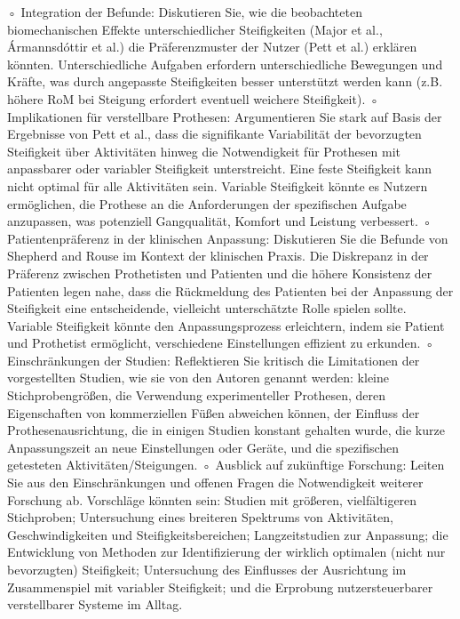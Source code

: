 \documentclass{SeminarV2}
\begin{document}
◦
Integration der Befunde: Diskutieren Sie, wie die beobachteten biomechanischen Effekte unterschiedlicher Steifigkeiten (Major et al., Ármannsdóttir et al.) die Präferenzmuster der Nutzer (Pett et al.) erklären könnten. Unterschiedliche Aufgaben erfordern unterschiedliche Bewegungen und Kräfte, was durch angepasste Steifigkeiten besser unterstützt werden kann (z.B. höhere RoM bei Steigung erfordert eventuell weichere Steifigkeit).
◦
Implikationen für verstellbare Prothesen: Argumentieren Sie stark auf Basis der Ergebnisse von Pett et al., dass die signifikante Variabilität der bevorzugten Steifigkeit über Aktivitäten hinweg die Notwendigkeit für Prothesen mit anpassbarer oder variabler Steifigkeit unterstreicht. Eine feste Steifigkeit kann nicht optimal für alle Aktivitäten sein. Variable Steifigkeit könnte es Nutzern ermöglichen, die Prothese an die Anforderungen der spezifischen Aufgabe anzupassen, was potenziell Gangqualität, Komfort und Leistung verbessert.
◦
Patientenpräferenz in der klinischen Anpassung: Diskutieren Sie die Befunde von Shepherd and Rouse im Kontext der klinischen Praxis. Die Diskrepanz in der Präferenz zwischen Prothetisten und Patienten und die höhere Konsistenz der Patienten legen nahe, dass die Rückmeldung des Patienten bei der Anpassung der Steifigkeit eine entscheidende, vielleicht unterschätzte Rolle spielen sollte. Variable Steifigkeit könnte den Anpassungsprozess erleichtern, indem sie Patient und Prothetist ermöglicht, verschiedene Einstellungen effizient zu erkunden.
◦
Einschränkungen der Studien: Reflektieren Sie kritisch die Limitationen der vorgestellten Studien, wie sie von den Autoren genannt werden: kleine Stichprobengrößen, die Verwendung experimenteller Prothesen, deren Eigenschaften von kommerziellen Füßen abweichen können, der Einfluss der Prothesenausrichtung, die in einigen Studien konstant gehalten wurde, die kurze Anpassungszeit an neue Einstellungen oder Geräte, und die spezifischen getesteten Aktivitäten/Steigungen.
◦
Ausblick auf zukünftige Forschung: Leiten Sie aus den Einschränkungen und offenen Fragen die Notwendigkeit weiterer Forschung ab. Vorschläge könnten sein: Studien mit größeren, vielfältigeren Stichproben; Untersuchung eines breiteren Spektrums von Aktivitäten, Geschwindigkeiten und Steifigkeitsbereichen; Langzeitstudien zur Anpassung; die Entwicklung von Methoden zur Identifizierung der wirklich optimalen (nicht nur bevorzugten) Steifigkeit; Untersuchung des Einflusses der Ausrichtung im Zusammenspiel mit variabler Steifigkeit; und die Erprobung nutzersteuerbarer verstellbarer Systeme im Alltag.
\end{document}

